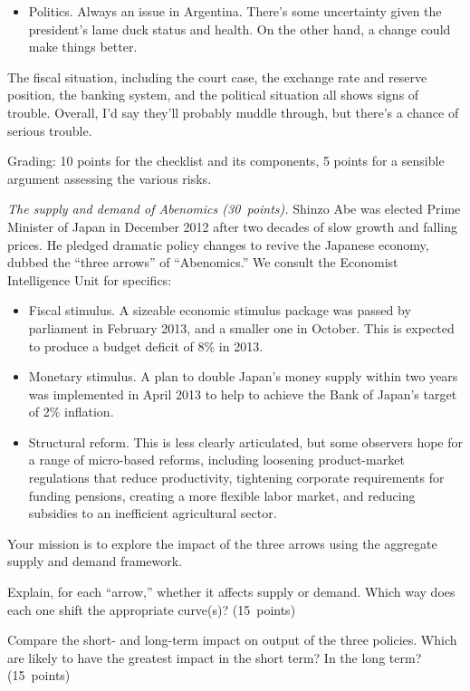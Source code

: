 \documentclass[letterpaper,12pt]{exam}
\begin{document}
\begin{questions}
\begin{solution}
\begin{parts}
\begin{itemize}
\item Politics.  Always an issue in Argentina.  
There's some uncertainty given the president's lame duck status and health.
On the other hand, a change could make things better.  
\end{itemize}
% 
The fiscal situation, including the court case, the exchange rate and reserve position, 
the banking system, and the political situation all shows signs of trouble.  
Overall, I'd say they'll probably muddle through, 
but there's a chance of serious trouble.

Grading:  10 points for the checklist and its components,
5 points for a sensible argument assessing the various risks.
\end{parts}
\end{solution}


\item  {\it The supply and demand of Abenomics (30~points).\/}
Shinzo Abe was elected Prime Minister of Japan in December 2012
after two decades of slow growth and falling prices.
He pledged dramatic policy changes to revive the Japanese economy,
dubbed the ``three arrows'' of ``Abenomics.''
We consult the Economist Intelligence Unit for specifics:
%
\begin{itemize}
\item Fiscal stimulus.  A sizeable economic stimulus package was passed by parliament in
February 2013, and a smaller one in October.
This is expected to produce a budget deficit of 8\% in 2013.
\item Monetary stimulus. A plan to double Japan's
money supply within two years was implemented in April 2013 to help to achieve the Bank of Japan's
target of 2\%  inflation.
\item Structural reform.
This is less clearly articulated, but some observers hope for a range of micro-based reforms,
including loosening product-market regulations that reduce productivity,
tightening corporate requirements for funding pensions,
creating a more flexible labor market,
and reducing subsidies to an inefficient agricultural sector.
\end{itemize}
%
Your mission is to explore the impact of the three arrows using the aggregate supply and demand
framework.
\begin{parts}
\item Explain, for each ``arrow,'' whether it affects supply or demand.
Which way does each one shift the appropriate curve(s)?
(15~points)
\item Compare the short- and long-term impact on output of the three policies.
Which are likely to have the greatest impact in the short term?
In the long term?
(15~points)
\end{parts}


\end{questions}
\end{document}
